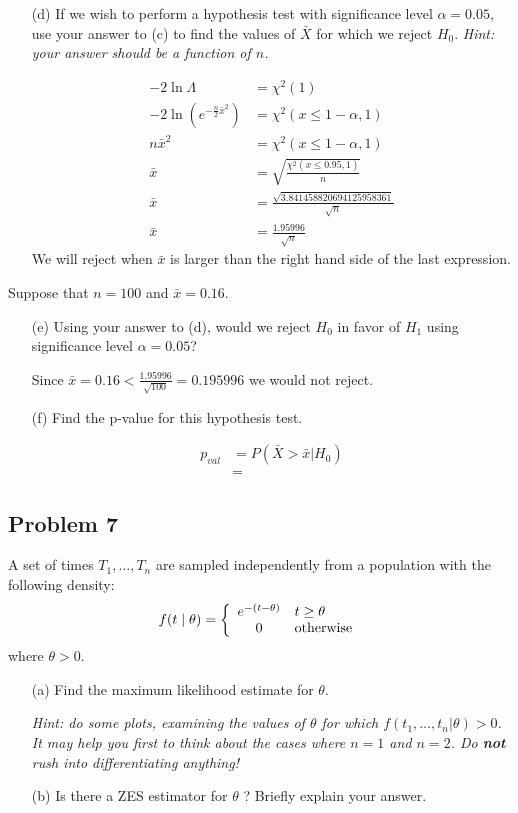 \documentclass{article}
\newcommand{\1}{\mathbf{1}}
\begin{document}
\begin{itemize}
    \newpage
    \item[(d)]  If we wish to perform a hypothesis test with significance level $\alpha = 0.05$, use your answer to (c) to find the values of $\bar{X}$ for which we reject $H_0$. {\it Hint: your answer should be a function of $n$.}
    
    \begin{align*}
    -2\ln{\Lambda} &= \chi^2(1) \\
    -2\ln{\left( e^{ -\frac{n}{2}\bar x^2 } \right)} &= \chi^2(x\leq 1-\alpha, 1) \\
    n\bar x^2 &= \chi^2(x\leq 1-\alpha, 1) \\
    \bar x &= \sqrt{\frac{\chi^2(x\leq 0.95, 1)}{n}} \\
    \bar x &= \frac{\sqrt{3.841458820694125958361}}{\sqrt{n}} \\
    \bar x &= \frac{1.95996}{\sqrt{n}}
    \end{align*}    
    We will reject when $\bar x$ is larger than the right hand side of the last expression.
\end{itemize}
Suppose that $n=100$ and $\bar{x}=0.16$. 
\begin{itemize}
    \item[(e)] Using your answer to (d), would we reject $H_0$ in favor of $H_1$ using significance level $\alpha=0.05$?
    
    Since $\bar x = 0.16 < \frac{1.95996}{\sqrt{100}} = 0.195996$ we would not reject.
    
    \item[(f)] Find the p-value for this hypothesis test.
    
    
    \begin{align*}
        p_{val} &= P(\bar X > \bar x | H_0) \\
        &= 
    \end{align*}
\end{itemize}


\newpage
\subsection*{Problem 7}
A set of  times $T_1,\ldots ,T_n$ are sampled independently from a population with the following density:
$$f(t \mid \theta)  = \left\{\begin{array}{cl}
    e^{-(t-\theta)} & t \geq \theta \\
    0 & \hbox{otherwise}
    \end{array}\right.
$$
where $\theta >0$. \par
\begin{itemize}
    \item[(a)] Find the maximum likelihood estimate for $\theta$.\par
    {\it Hint: do some plots, examining the values of $\theta$ for which $f(t_1,\ldots,t_n|\theta)>0$. It may help you first to think about the cases where $n=1$ and $n=2$.  Do {\bf not}  rush into differentiating anything!}
    \item[(b)] Is there a ZES estimator for $\theta$ ? Briefly explain your answer.
\end{itemize}
\end{document}
